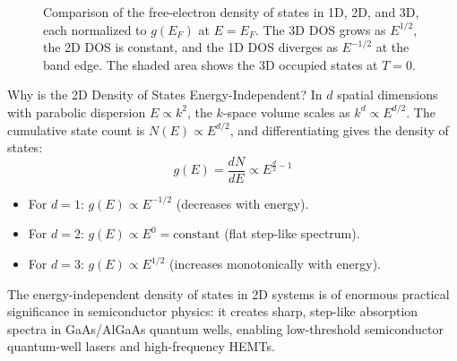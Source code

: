 \documentclass[11pt,a4paper]{article}
\begin{document}
\begin{figure}[h]
\centering
{}
\caption{Comparison of the free-electron density of states in 1D, 2D, and 3D, each normalized to $g(E_F)$ at $E=E_F$. The 3D DOS grows as $E^{1/2}$, the 2D DOS is constant, and the 1D DOS diverges as $E^{-1/2}$ at the band edge. The shaded area shows the 3D occupied states at $T=0$.}
\label{fig:dos}
\end{figure}

\begin{checkpointbox}{Why is the 2D Density of States Energy-Independent?}
In $d$ spatial dimensions with parabolic dispersion $E \propto k^2$, the $k$-space volume scales as $k^d \propto E^{d/2}$. The cumulative state count is $N(E) \propto E^{d/2}$, and differentiating gives the density of states:
\[
g(E) = \frac{dN}{dE} \propto E^{\frac{d}{2} - 1}
\]
\begin{itemize}
    \item For $d=1$: $g(E) \propto E^{-1/2}$ (decreases with energy).
    \item For $d=2$: $g(E) \propto E^0 = \text{constant}$ (flat step-like spectrum).
    \item For $d=3$: $g(E) \propto E^{1/2}$ (increases monotonically with energy).
\end{itemize}
The energy-independent density of states in 2D systems is of enormous practical significance in semiconductor physics: it creates sharp, step-like absorption spectra in GaAs/AlGaAs quantum wells, enabling low-threshold semiconductor quantum-well lasers and high-frequency HEMTs.
\end{checkpointbox}
\end{document}
